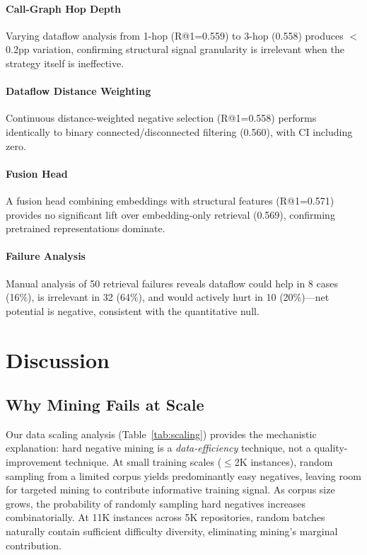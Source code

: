 \documentclass[11pt,a4paper]{article}
\begin{document}
\paragraph{Call-Graph Hop Depth}
Varying dataflow analysis from 1-hop (R@1=0.559) to 3-hop (0.558) produces $<$0.2pp variation, confirming structural signal granularity is irrelevant when the strategy itself is ineffective.

\paragraph{Dataflow Distance Weighting}
Continuous distance-weighted negative selection (R@1=0.558) performs identically to binary connected/disconnected filtering (0.560), with CI including zero.

\paragraph{Fusion Head}
A fusion head combining embeddings with structural features (R@1=0.571) provides no significant lift over embedding-only retrieval (0.569), confirming pretrained representations dominate.

\paragraph{Failure Analysis}
Manual analysis of 50 retrieval failures reveals dataflow could help in 8 cases (16\%), is irrelevant in 32 (64\%), and would actively hurt in 10 (20\%)---net potential is negative, consistent with the quantitative null.

\section{Discussion}

\subsection{Why Mining Fails at Scale}

Our data scaling analysis (Table~\ref{tab:scaling}) provides the mechanistic explanation: hard negative mining is a \textit{data-efficiency} technique, not a quality-improvement technique.
At small training scales ($\leq$2K instances), random sampling from a limited corpus yields predominantly easy negatives, leaving room for targeted mining to contribute informative training signal.
As corpus size grows, the probability of randomly sampling hard negatives increases combinatorially.
At 11K instances across 5K repositories, random batches naturally contain sufficient difficulty diversity, eliminating mining's marginal contribution.
\end{document}
